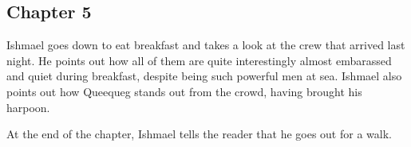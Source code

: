 \subsection{Chapter 5}

Ishmael goes down to eat breakfast and takes a look at the crew that arrived
last night. He points out how all of them are quite interestingly almost
embarassed and quiet during breakfast, despite being such powerful men at sea.
Ishmael also points out how Queequeg stands out from the crowd, having brought
his harpoon.

At the end of the chapter, Ishmael tells the reader that he goes out for a
walk.
